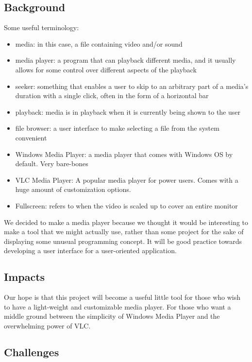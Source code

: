 \documentclass[10pt,conference,onecolumn,compsoc]{IEEEtran}
\begin{document}
\subsection{Background}

Some useful terminology: 
\begin{itemize}
\item media: in this case, a file containing video and/or sound
\item media player: a program that can playback different media, and it usually allows for some control over different aspects of the playback
\item seeker: something that enables a user to skip to an arbitrary part of a media's duration with a single click, often in the form of a horizontal bar  
\item playback: media is in playback when it is currently being shown to the user  
\item file browser: a user interface to make selecting a file from the system convenient  
\item Windows Media Player: a media player that comes with Windows OS by default. Very bare-bones  
\item VLC Media Player: A popular media player for power users. Comes with a huge amount of customization options.
\item Fullscreen: refers to when the video is scaled up to cover an entire monitor  
\end{itemize}

We decided to make a media player because we thought it would be interesting to make a tool that we might actually use, rather than some project for the sake of displaying some unusual programming concept. It will be good practice towards developing a user interface for a user-oriented application. 

\subsection{Impacts}

Our hope is that this project will become a useful little tool for those who wish to have a light-weight and customizable media player. For those who want a middle ground between the simplicity of Windows Media Player and the overwhelming power of VLC.

\subsection{Challenges}
\end{document}
